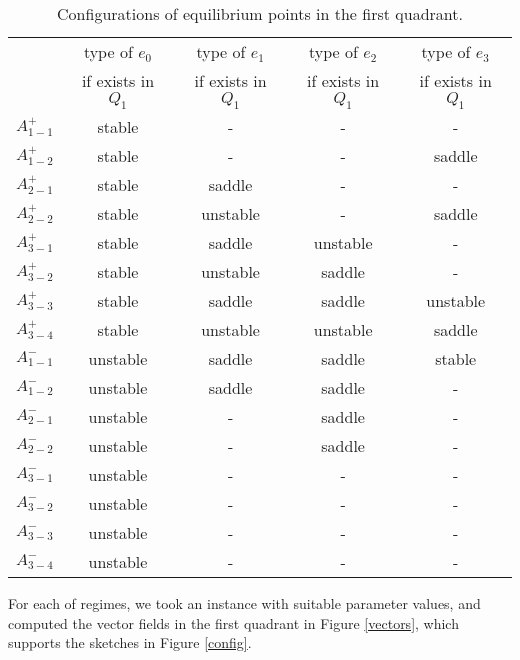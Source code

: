 \documentclass{amsart}
\theoremstyle{definition}
\numberwithin{equation}{section}
\begin{document}
\renewcommand{\arraystretch}{1.5}
 \medskip
 \begin{table}[ht]
 \centering
 \begin{tabular}{|c|c|c|c|c|}
\hline
& type of $e_0$ & type of $e_1$ & type of $e_2$ & type of $e_3$ \\
& if exists in $Q_1$ & if exists in $Q_1$ & if exists in $Q_1$ & if exists in $Q_1$\\
\hline
$A^+_{1-1}$ & stable & - & - & - \\
\hline
$A^+_{1-2}$ & stable & - & - & saddle \\
\hline
$A^+_{2-1}$ & stable & saddle & - & - \\
\hline
$A^+_{2-2}$ & stable & unstable & - & saddle \\
\hline
$A^+_{3-1}$ & stable & saddle & unstable & - \\
\hline
$A^+_{3-2}$ & stable & unstable & saddle & - \\
\hline
$A^+_{3-3}$ & stable & saddle & saddle & unstable \\
\hline
$A^+_{3-4}$ & stable & unstable & unstable & saddle \\
\hline
$A^-_{1-1}$ & unstable & saddle & saddle & stable \\
\hline
$A^-_{1-2}$ & unstable & saddle & saddle & - \\
\hline
$A^-_{2-1}$ & unstable & - & saddle & - \\
\hline
$A^-_{2-2}$ & unstable & - & saddle & - \\
\hline
$A^-_{3-1}$ & unstable & - & - & - \\
\hline
$A^-_{3-2}$ & unstable & - & - & - \\
\hline
$A^-_{3-3}$ & unstable & - & - & - \\
\hline
$A^-_{3-4}$ & unstable & - & - & - \\
\hline
\end{tabular}
\medskip
\caption{Configurations of equilibrium points in the first quadrant.} \label{table1}
\end{table}
For each of regimes, we took an instance with suitable parameter values, and computed the vector fields in the first quadrant in Figure \ref{vectors}, which supports the sketches in Figure \ref{config}.
\end{document}
